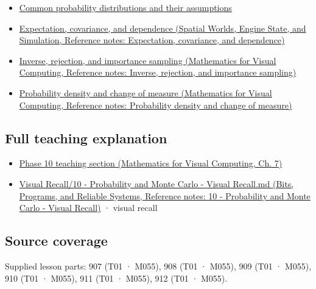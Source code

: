 \begin{itemize}
\tightlist
\item
  \hyperref[appendix-a2360b435383]{Common probability distributions and their assumptions}
\item
  \href{../05-Spatial-Worlds-Engine-State-and-Simulation/main.pdf\#nameddest=appendix-54c383df9992}{Expectation, covariance, and dependence (Spatial Worlds, Engine State, and Simulation, Reference notes: Expectation, covariance, and dependence)}
\item
  \href{../02-Mathematics-for-Visual-Computing/main.pdf\#nameddest=appendix-8d863ed954d0}{Inverse, rejection, and importance sampling (Mathematics for Visual Computing, Reference notes: Inverse, rejection, and importance sampling)}
\item
  \href{../02-Mathematics-for-Visual-Computing/main.pdf\#nameddest=appendix-4815cd87ab8b}{Probability density and change of measure (Mathematics for Visual Computing, Reference notes: Probability density and change of measure)}
\end{itemize}

\subsection{Full teaching explanation}\label{appendix-4d0203f7944f-full-teaching-explanation}

\begin{itemize}
\tightlist
\item
  \href{../02-Mathematics-for-Visual-Computing/main.pdf\#nameddest=02-foundations-ii-ch023-random-quantities-and-their-probability-laws}{Phase 10 teaching section (Mathematics for Visual Computing, Ch. 7)}
\item
  \href{../01-Bits-Programs-and-Reliable-Systems/main.pdf\#nameddest=appendix-cb5af353ef77}{Visual Recall/10 - Probability and Monte Carlo - Visual Recall.md (Bits, Programs, and Reliable Systems, Reference notes: 10 - Probability and Monte Carlo - Visual Recall)} · visual recall
\end{itemize}

\subsection{Source coverage}\label{appendix-4d0203f7944f-source-coverage}

Supplied lesson parts: 907 (T01 · M055), 908 (T01 · M055), 909 (T01 · M055), 910 (T01 · M055), 911 (T01 · M055), 912 (T01 · M055).
